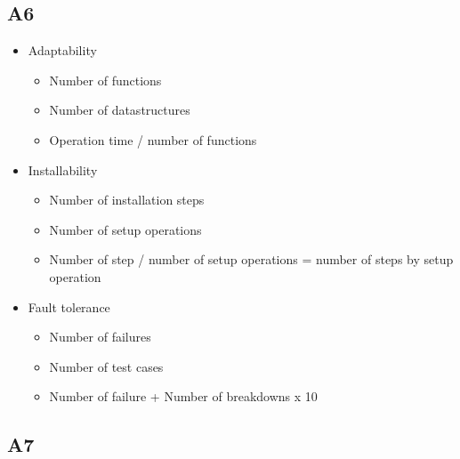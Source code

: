 \subsection*{A6}
    \begin{itemize}
        \item Adaptability
            \begin{itemize}
                \item Number of functions
                \item Number of datastructures
                \item Operation time / number of functions
            \end{itemize}
        \item Installability
            \begin{itemize}
                \item Number of installation steps
                \item Number of setup operations
                \item Number of step / number of setup operations = number of steps by setup operation
            \end{itemize}
        \item Fault tolerance
            \begin{itemize}
                \item Number of failures
                \item Number of test cases
                \item Number of failure + Number of breakdowns x 10
            \end{itemize}
    \end{itemize}

\subsection*{A7}
